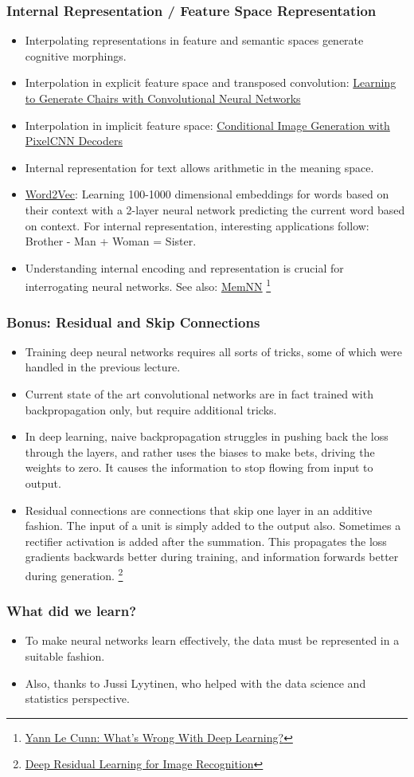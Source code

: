 \documentclass[8pt]{beamer}
\begin{document}
\begin{frame}
\frametitle{Internal Representation / Feature Space Representation}
 \begin{itemize}
  \item Interpolating representations in feature and semantic spaces generate cognitive morphings.
  \item Interpolation in explicit feature space and transposed convolution:
        \href{https://www.youtube.com/watch?v=QCSW4isBDL0}{Learning to Generate Chairs with Convolutional Neural Networks}
  \item Interpolation in implicit feature space:
        \href{https://arxiv.org/abs/1606.05328}{Conditional Image Generation with PixelCNN Decoders}
  \item Internal representation for text allows arithmetic in the meaning space.
  \item \href{http://deeplearning4j.org/word2vec.html}{Word2Vec}: Learning 100-1000 dimensional embeddings for words based on their context with a 2-layer neural network
        predicting the current word based on context. For internal representation, interesting applications follow: Brother - Man + Woman = Sister.
  \item Understanding internal encoding and representation is crucial for interrogating neural networks. See also: \href{http://arxiv.org/pdf/1410.3916v11.pdf}{MemNN}
        \footnote{\href{http://www.pamitc.org/cvpr15/files/lecun-20150610-cvpr-keynote.pdf}{Yann Le Cunn: What's Wrong With Deep Learning?}}
 \end{itemize}
\end{frame}

\begin{frame}
\frametitle{Bonus: Residual and Skip Connections}
 \begin{itemize}
  \item Training deep neural networks requires all sorts of tricks, some of which were handled in the previous lecture.
  \item Current state of the art convolutional networks are in fact trained with backpropagation only, but require additional tricks.
  \item In deep learning, naive backpropagation struggles in pushing back the loss through the layers, and rather uses the biases to make bets, driving the weights to zero.
        It causes the information to stop flowing from input to output.
  \item Residual connections are connections that skip one layer in an additive fashion.
        The input of a unit is simply added to the output also. Sometimes a rectifier activation is added after the summation.
        This propagates the loss gradients backwards better during training, and information forwards better during generation.
        \footnote{\href{https://arxiv.org/abs/1512.03385}{Deep Residual Learning for Image Recognition}}
 \end{itemize}
\end{frame}

\begin{frame}
\frametitle{What did we learn?}
 \begin{itemize}
  \item To make neural networks learn effectively, the data must be represented in a suitable fashion.
  \item Also, thanks to Jussi Lyytinen, who helped with the data science and statistics perspective.
 \end{itemize}
\end{frame}
\end{document}
